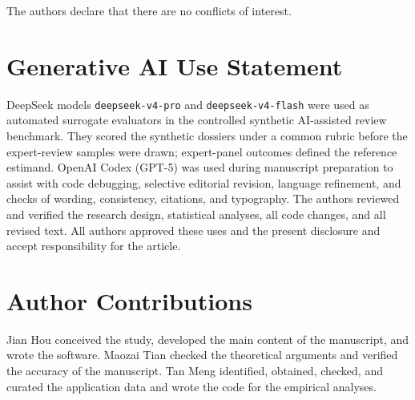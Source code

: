 The authors declare that there are no conflicts of interest.

\section*{Generative AI Use Statement}

DeepSeek models \texttt{deepseek-v4-pro} and
\texttt{deepseek-v4-flash} were used as automated surrogate evaluators in the
controlled synthetic AI-assisted review benchmark. They scored the synthetic
dossiers under a common rubric before the expert-review samples were drawn;
expert-panel outcomes defined the reference estimand.
OpenAI Codex (GPT-5) was used during manuscript preparation to assist with code
debugging, selective editorial revision, language refinement, and checks of
wording, consistency, citations, and typography. The authors reviewed and verified the research
design, statistical analyses, all code changes, and all revised text. All
authors approved these uses and the present disclosure and accept
responsibility for the article.

\ifblinded
\else
\section*{Author Contributions}

Jian Hou conceived the study, developed the main content of the manuscript, and wrote the software. Maozai Tian checked the theoretical arguments and verified the accuracy of the manuscript. Tan Meng identified, obtained, checked, and curated the application data and wrote the code for the empirical analyses.
\fi
